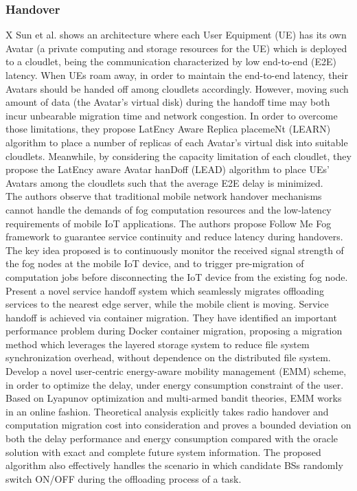 \subsubsection{Handover}
\noindent\tab X Sun et al. \cite{sun2017avaptive} shows an architecture where each User Equipment (UE) has its own Avatar (a private computing and storage resources for the UE) which is deployed to a cloudlet, being the communication characterized by low end-to-end (E2E) latency. When UEs roam away, in order to maintain the end-to-end latency, their Avatars should be handed off among cloudlets accordingly. However, moving such amount of data (the Avatar’s virtual disk) during the handoff time may both incur unbearable migration time and network congestion. In order to overcome those limitations, they propose LatEncy Aware Replica placemeNt (LEARN) algorithm to place a number of replicas of each Avatar’s virtual disk into suitable cloudlets. Meanwhile, by considering the capacity limitation of each cloudlet, they propose the LatEncy aware Avatar hanDoff (LEAD) algorithm to place
UEs’ Avatars among the cloudlets such that the average E2E delay is minimized.\\ %
\cite{bao2017follow}
The authors observe that traditional mobile network handover mechanisms cannot handle the demands of fog computation resources and the low-latency requirements of mobile IoT applications. The authors propose Follow Me Fog framework to guarantee service continuity and reduce latency during handovers. The key idea proposed is to continuously monitor the received signal strength of the fog nodes at the mobile IoT device, and to trigger pre-migration of computation jobs before disconnecting the IoT device from the existing fog node.\\
\cite{ma2017efficient}
Present a novel service handoff system which seamlessly migrates offloading services to the nearest edge server, while the mobile client is moving. Service handoff is achieved via container migration. They have identified an important performance problem during Docker container migration, proposing a migration method which leverages the layered storage system to reduce file system synchronization overhead, without dependence on the distributed file system.\\
\cite{sun2017emm}
Develop a novel user-centric energy-aware mobility management (EMM) scheme, in order to optimize the delay, under energy consumption constraint of the user. Based on Lyapunov optimization and multi-armed bandit theories, EMM works in an online fashion. Theoretical analysis explicitly takes radio handover and computation migration cost into consideration and proves a bounded deviation on both the delay performance and energy consumption compared with the oracle solution with exact and complete future system information. The proposed algorithm also effectively handles the scenario in which candidate BSs randomly switch ON/OFF during the offloading process of a task.\\
